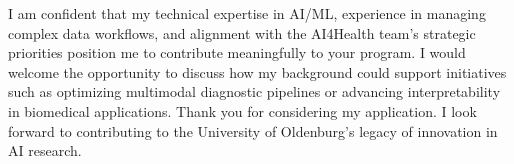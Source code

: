 \documentclass[11pt,a4paper, final]{moderncv}
\begin{document}
I am confident that my technical expertise in AI/ML, experience in managing complex data workflows, and alignment with the AI4Health team's strategic priorities position me to contribute meaningfully to your program. 
I would welcome the opportunity to discuss how my background could support initiatives such as optimizing multimodal diagnostic pipelines or advancing interpretability in biomedical applications. 
Thank you for considering my application. 
I look forward to contributing to the University of Oldenburg's legacy of innovation in AI research.

\makeletterclosing
\end{document}

